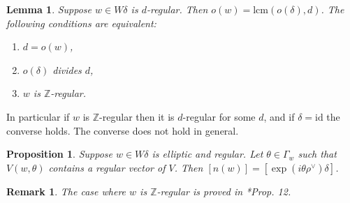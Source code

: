 \documentclass[10pt,leqno]{article}
\newtheorem{lemma}[equation]{Lemma}
\newtheorem{proposition}[equation]{Proposition}
\newtheorem{remark}[equation]{Remark}
{\theorembodyfont{\rmfamily}
\newtheorem{theoremplain}[equation]{Theorem}
\newtheorem{remarkplain}[equation]{Remark}
\newtheorem{editorialremarkplain}[equation]{Editorial Remark}
\newtheorem{exampleplain}[equation]{Example}
\newtheorem{corollaryplain}[equation]{Corollary}
}
\newcommand{\Z}{\mathbb Z}
\def\G{\Gamma}
\def\d{\delta}
\begin{document}
\begin{lemma} Suppose $w\in W\delta$ is $d$-regular.  Then
$o(w)=\text{lcm}(o(\delta),d)$.  The following conditions are
equivalent:
	\begin{enumerate}
		\item $d=o(w)$,
		\item $o(\delta)$ divides $d$,
		\item $w$ is $\mathbb Z$-regular.
	\end{enumerate}
\end{lemma}

In particular if $w$ is $\Z$-regular then it is $d$-regular for some $d$, and if $\delta=\text{id}$ the converse holds.
The converse does not hold in general. %

\begin{proposition}\label{regular} Suppose $w \in W\d$ is elliptic and
regular. Let $\theta \in \G_w$ such that $V(w, \theta)$ contains a
regular vector of $V$. Then $[n(w)]=[\exp(i \theta\rho^\vee)\delta]$.
\end{proposition}
\begin{remark}
The case where $w$ is $\mathbb Z$-regular is proved in \cite{rgly}*{Prop. 12}. 
\end{remark}
\end{document}
